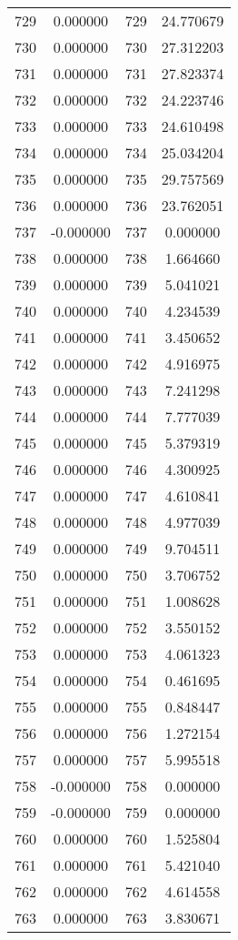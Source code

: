 \documentclass[12pt]{article}
\begin{document}
\begin{longtable}{@{}cccc@{}}
729 & 0.000000 & 729 & 24.770679 \\
730 & 0.000000 & 730 & 27.312203 \\
731 & 0.000000 & 731 & 27.823374 \\
732 & 0.000000 & 732 & 24.223746 \\
733 & 0.000000 & 733 & 24.610498 \\
734 & 0.000000 & 734 & 25.034204 \\
735 & 0.000000 & 735 & 29.757569 \\
736 & 0.000000 & 736 & 23.762051 \\
737 & -0.000000 & 737 & 0.000000 \\
738 & 0.000000 & 738 & 1.664660 \\
739 & 0.000000 & 739 & 5.041021 \\
740 & 0.000000 & 740 & 4.234539 \\
741 & 0.000000 & 741 & 3.450652 \\
742 & 0.000000 & 742 & 4.916975 \\
743 & 0.000000 & 743 & 7.241298 \\
744 & 0.000000 & 744 & 7.777039 \\
745 & 0.000000 & 745 & 5.379319 \\
746 & 0.000000 & 746 & 4.300925 \\
747 & 0.000000 & 747 & 4.610841 \\
748 & 0.000000 & 748 & 4.977039 \\
749 & 0.000000 & 749 & 9.704511 \\
750 & 0.000000 & 750 & 3.706752 \\
751 & 0.000000 & 751 & 1.008628 \\
752 & 0.000000 & 752 & 3.550152 \\
753 & 0.000000 & 753 & 4.061323 \\
754 & 0.000000 & 754 & 0.461695 \\
755 & 0.000000 & 755 & 0.848447 \\
756 & 0.000000 & 756 & 1.272154 \\
757 & 0.000000 & 757 & 5.995518 \\
758 & -0.000000 & 758 & 0.000000 \\
759 & -0.000000 & 759 & 0.000000 \\
760 & 0.000000 & 760 & 1.525804 \\
761 & 0.000000 & 761 & 5.421040 \\
762 & 0.000000 & 762 & 4.614558 \\
763 & 0.000000 & 763 & 3.830671 \\

\end{longtable}
\end{document}
